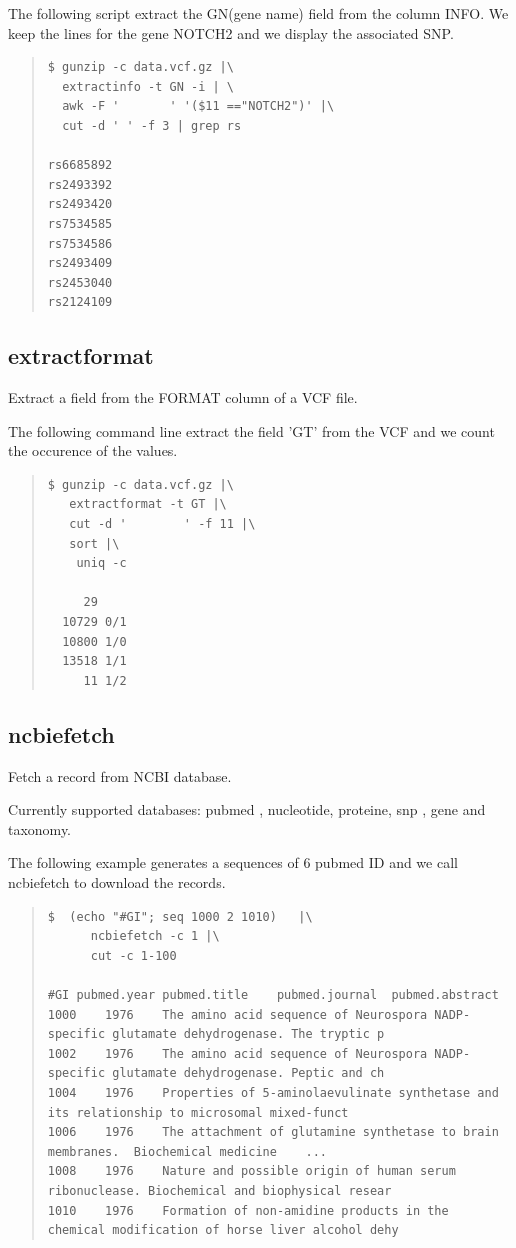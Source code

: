 \documentclass[12pt]{article}
\begin{document}
The following script extract the GN(gene name) field from the column INFO. We keep the lines for the gene NOTCH2 and we display the associated SNP.
\begin{quote}
\begin{verbatim}
$ gunzip -c data.vcf.gz |\
  extractinfo -t GN -i | \
  awk -F '       ' '($11 =="NOTCH2")' |\
  cut -d ' ' -f 3 | grep rs

rs6685892
rs2493392
rs2493420
rs7534585
rs7534586
rs2493409
rs2453040
rs2124109

\end{verbatim}
\end{quote}

\subsection{extractformat}
Extract a field from the FORMAT column of a VCF file.

The following command line extract the field 'GT' from the VCF and we count the occurence of the values.

\begin{quote}
\begin{verbatim}
$ gunzip -c data.vcf.gz |\
   extractformat -t GT |\
   cut -d '        ' -f 11 |\
   sort |\
    uniq -c

     29 
  10729 0/1
  10800 1/0
  13518 1/1
     11 1/2
\end{verbatim}
\end{quote}

\subsection{ncbiefetch}
Fetch a record from NCBI database.

Currently supported databases: pubmed , nucleotide, proteine, snp , gene and taxonomy.

The following example generates a sequences of 6 pubmed ID and we call ncbiefetch to download the records.
\begin{quote}
\begin{verbatim}
$  (echo "#GI"; seq 1000 2 1010)   |\
      ncbiefetch -c 1 |\
      cut -c 1-100

#GI	pubmed.year	pubmed.title	pubmed.journal	pubmed.abstract
1000	1976	The amino acid sequence of Neurospora NADP-specific glutamate dehydrogenase. The tryptic p
1002	1976	The amino acid sequence of Neurospora NADP-specific glutamate dehydrogenase. Peptic and ch
1004	1976	Properties of 5-aminolaevulinate synthetase and its relationship to microsomal mixed-funct
1006	1976	The attachment of glutamine synthetase to brain membranes.	Biochemical medicine	...
1008	1976	Nature and possible origin of human serum ribonuclease.	Biochemical and biophysical resear
1010	1976	Formation of non-amidine products in the chemical modification of horse liver alcohol dehy
\end{verbatim}
\end{quote}
\end{document}
